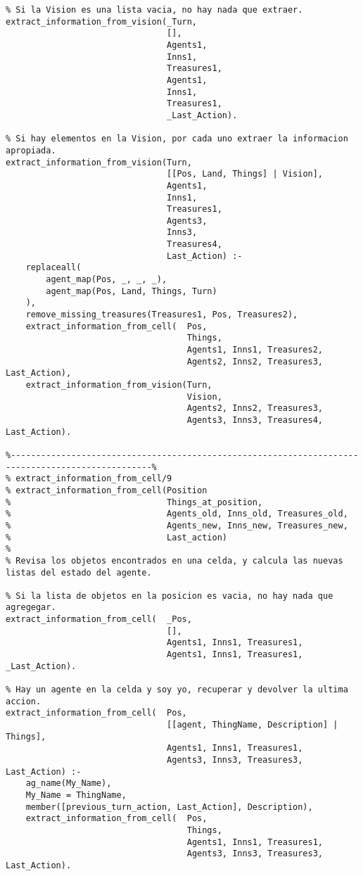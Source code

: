\documentclass[a4paper,12pt]{report}
\begin{document}
\begin{scriptsize}
\begin{verbatim}
% Si la Vision es una lista vacia, no hay nada que extraer. 
extract_information_from_vision(_Turn, 
                                [],                             
                                Agents1, 
                                Inns1, 
                                Treasures1, 
                                Agents1, 
                                Inns1, 
                                Treasures1, 
                                _Last_Action).

% Si hay elementos en la Vision, por cada uno extraer la informacion apropiada. 
extract_information_from_vision(Turn,  
                                [[Pos, Land, Things] | Vision], 
                                Agents1, 
                                Inns1, 
                                Treasures1, 
                                Agents3, 
                                Inns3, 
                                Treasures4,  
                                Last_Action) :-
    replaceall(
        agent_map(Pos, _, _, _), 
        agent_map(Pos, Land, Things, Turn)
    ),
    remove_missing_treasures(Treasures1, Pos, Treasures2),
    extract_information_from_cell(  Pos, 
                                    Things, 
                                    Agents1, Inns1, Treasures2, 
                                    Agents2, Inns2, Treasures3, Last_Action),
    extract_information_from_vision(Turn, 
                                    Vision, 
                                    Agents2, Inns2, Treasures3, 
                                    Agents3, Inns3, Treasures4, Last_Action).

%--------------------------------------------------------------------------------------------------%
% extract_information_from_cell/9
% extract_information_from_cell(Position
%                               Things_at_position,
%                               Agents_old, Inns_old, Treasures_old,
%                               Agents_new, Inns_new, Treasures_new,
%                               Last_action)
%
% Revisa los objetos encontrados en una celda, y calcula las nuevas listas del estado del agente.

% Si la lista de objetos en la posicion es vacia, no hay nada que agregegar.
extract_information_from_cell(  _Pos, 
                                [],
                                Agents1, Inns1, Treasures1, 
                                Agents1, Inns1, Treasures1, _Last_Action).

% Hay un agente en la celda y soy yo, recuperar y devolver la ultima accion.
extract_information_from_cell(  Pos, 
                                [[agent, ThingName, Description] | Things], 
                                Agents1, Inns1, Treasures1, 
                                Agents3, Inns3, Treasures3,  Last_Action) :- 
    ag_name(My_Name),
    My_Name = ThingName,
    member([previous_turn_action, Last_Action], Description), 
    extract_information_from_cell(  Pos, 
                                    Things, 
                                    Agents1, Inns1, Treasures1, 
                                    Agents3, Inns3, Treasures3, Last_Action).


\end{verbatim}
\end{scriptsize}
\end{document}
